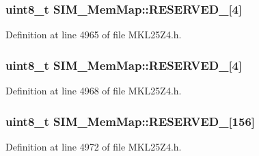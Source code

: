 \subsubsection[{\texorpdfstring{R\+E\+S\+E\+R\+V\+E\+D\+\_\+5}{RESERVED_5}}]{\setlength{\rightskip}{0pt plus 5cm}uint8\+\_\+t S\+I\+M\+\_\+\+Mem\+Map\+::\+R\+E\+S\+E\+R\+V\+E\+D\+\_\mbox{[}4\mbox{]}}\hypertarget{struct_s_i_m___mem_map_ad7e1d9ac03bc795d98c49ee8574bfedc}{}\label{struct_s_i_m___mem_map_ad7e1d9ac03bc795d98c49ee8574bfedc}


Definition at line 4965 of file M\+K\+L25\+Z4.\+h.

\subsubsection[{\texorpdfstring{R\+E\+S\+E\+R\+V\+E\+D\+\_\+6}{RESERVED_6}}]{\setlength{\rightskip}{0pt plus 5cm}uint8\+\_\+t S\+I\+M\+\_\+\+Mem\+Map\+::\+R\+E\+S\+E\+R\+V\+E\+D\+\_\mbox{[}4\mbox{]}}\hypertarget{struct_s_i_m___mem_map_a93af4e6410ab634b2377389fc500c73a}{}\label{struct_s_i_m___mem_map_a93af4e6410ab634b2377389fc500c73a}


Definition at line 4968 of file M\+K\+L25\+Z4.\+h.

\subsubsection[{\texorpdfstring{R\+E\+S\+E\+R\+V\+E\+D\+\_\+7}{RESERVED_7}}]{\setlength{\rightskip}{0pt plus 5cm}uint8\+\_\+t S\+I\+M\+\_\+\+Mem\+Map\+::\+R\+E\+S\+E\+R\+V\+E\+D\+\_\mbox{[}156\mbox{]}}\hypertarget{struct_s_i_m___mem_map_aea5a0db6a5b82760418e4529895541da}{}\label{struct_s_i_m___mem_map_aea5a0db6a5b82760418e4529895541da}


Definition at line 4972 of file M\+K\+L25\+Z4.\+h.

